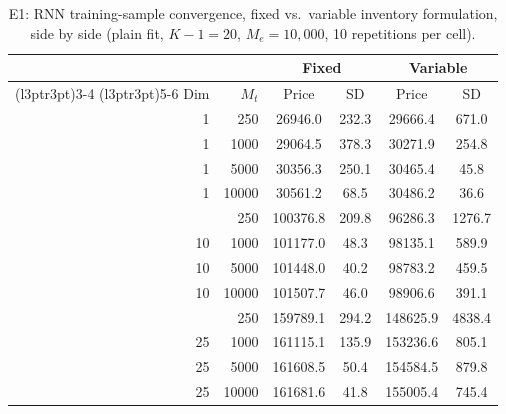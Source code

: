 \begin{table}

\caption{\label{tab:e1_inventory_mode_rnn_wide}E1: RNN training-sample convergence, fixed vs.\ variable inventory formulation, side by side (plain fit, $K-1=20$, $M_e=10{,}000$, 10 repetitions per cell).}
\footnotesize
\setlength{\tabcolsep}{4pt}
\centering
\begin{tabular}[t]{rrcccc}
\toprule
\multicolumn{2}{c}{ } & \multicolumn{2}{c}{Fixed} & \multicolumn{2}{c}{Variable} \\
\cmidrule(l{3pt}r{3pt}){3-4} \cmidrule(l{3pt}r{3pt}){5-6}
Dim & $M_t$ & Price & SD & Price & SD\\
\midrule
1 & 250 & 26946.0 & 232.3 & 29666.4 & 671.0\\
1 & 1000 & 29064.5 & 378.3 & 30271.9 & 254.8\\
1 & 5000 & 30356.3 & 250.1 & 30465.4 & 45.8\\
1 & 10000 & 30561.2 & 68.5 & 30486.2 & 36.6\\
\addlinespace
10 & 250 & 100376.8 & 209.8 & 96286.3 & 1276.7\\
10 & 1000 & 101177.0 & 48.3 & 98135.1 & 589.9\\
10 & 5000 & 101448.0 & 40.2 & 98783.2 & 459.5\\
10 & 10000 & 101507.7 & 46.0 & 98906.6 & 391.1\\
\addlinespace
25 & 250 & 159789.1 & 294.2 & 148625.9 & 4838.4\\
25 & 1000 & 161115.1 & 135.9 & 153236.6 & 805.1\\
25 & 5000 & 161608.5 & 50.4 & 154584.5 & 879.8\\
25 & 10000 & 161681.6 & 41.8 & 155005.4 & 745.4\\
\bottomrule
\end{tabular}
\end{table}
